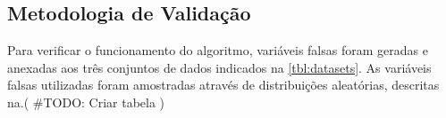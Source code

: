 \subsection{Metodologia de Validação}

Para verificar o funcionamento do algoritmo, variáveis falsas foram geradas e anexadas aos três conjuntos de 
dados indicados na \ref{tbl:datasets}. As variáveis falsas utilizadas foram amostradas através de distribuições
aleatórias, descritas na.( #TODO: Criar tabela )
